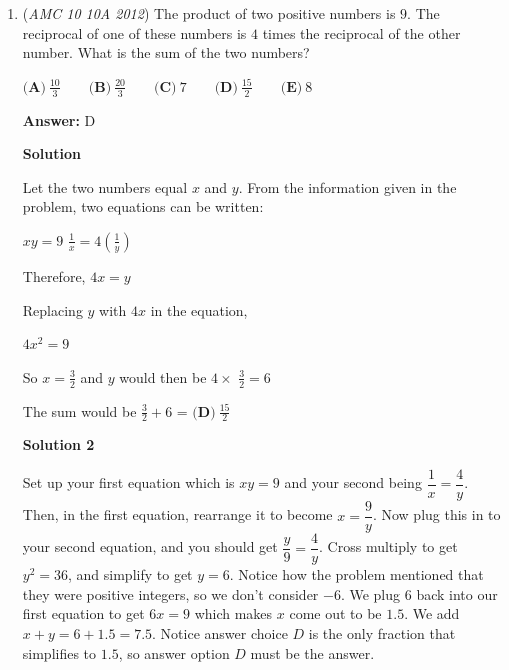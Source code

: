\begin{enumerate}
 $\textbf{(A)}\ 150\qquad\textbf{(B)}\ 200\qquad\textbf{(C)}\ 250\qquad\textbf{(D)}\ 300\qquad\textbf{(E)}\ 400$

 \textbf{Answer: }B



\textbf{Solution}

Half of the 100 adult cats are female, so there are $\frac{100}{2}$ = $50$ female cats.  Half of those female adult cats have a litter of kittens, so there would be $\frac{50}{2}$ = $25$ litters.  Since the average number of kittens per litter is 4, this implies that there are $25 \times 4$ = $100$ kittens.  So the total number of cats and kittens would be $100 + 100$ = $\boxed{\textbf{(B)}\ 200}$



	\item (\textit{AMC 10 10A 2012}) The product of two positive numbers is $9$. The reciprocal of one of these numbers is $4$ times the reciprocal of the other number. What is the sum of the two numbers?


 $\textbf{(A)}\ \frac{10}{3}\qquad\textbf{(B)}\ \frac{20}{3}\qquad\textbf{(C)}\ 7\qquad\textbf{(D)}\ \frac{15}{2}\qquad\textbf{(E)}\ 8$

 \textbf{Answer: }D



\textbf{Solution}

Let the two numbers equal $x$ and $y$. From the information given in the problem, two equations can be written:

 $xy=9$
$\frac{1}{x}=4 \left( \frac{1}{y} \right)$

 Therefore, $4x=y$

 Replacing $y$ with $4x$ in the equation,

 $4x^2=9$

 So $x=\frac{3}{2}$ and $y$ would then be $4 \times$ $\frac{3}{2}=6$

 The sum would be $\frac{3}{2}+6$ = $\boxed{\textbf{(D)}\ \frac{15}{2}}$




\textbf{Solution 2}

Set up your first equation which is $xy=9$ and your second being $\dfrac{1}{x} = \dfrac4y$. Then, in the first equation, rearrange it to become $x=\dfrac9y$. Now plug this in to your second equation, and you should get $\dfrac{y}{9}=\dfrac{4}{y}$. Cross multiply to get $y^2=36$, and simplify to get $y=6$. Notice how the problem mentioned that they were positive integers, so we don't consider $-6$. We plug $6$ back into our first equation to get $6x=9$ which makes $x$ come out to be $1.5$. We add $x+y=6+1.5=7.5$. Notice answer choice $D$ is the only fraction that simplifies to $1.5$, so answer option $\boxed{D}$ must be the answer.


\end{enumerate}
